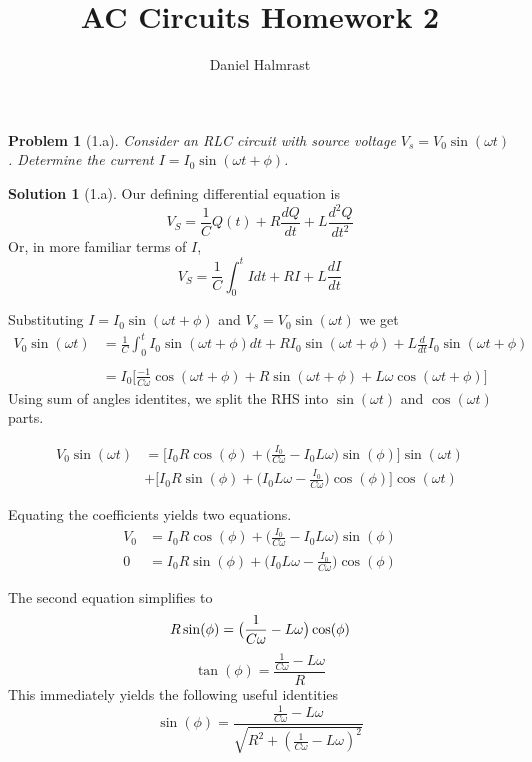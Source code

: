 \documentclass[12pt]{article}
\newtheorem*{problem}{Problem}
\theoremstyle{definition}
\newtheorem*{solution}{Solution}
\begin{document}
\title{AC Circuits Homework 2}
\author{Daniel Halmrast}
\maketitle

\begin{problem}[1.a]
Consider an RLC circuit with source voltage $V_s = V_0 \sin(\omega t)$.
Determine the current $I = I_0 \sin(\omega t + \phi)$.
\end{problem}

\begin{solution}[1.a]
Our defining differential equation is
\[
	V_S = \frac{1}{C}Q(t) + R\frac{dQ}{dt} + L\frac{d^2Q}{dt^2}
\]
Or, in more familiar terms of $I$,
\[
	V_S = \frac{1}{C}\int_0^t Idt + RI + L\frac{dI}{dt}
\]

Substituting $I = I_0 \sin(\omega t + \phi)$ and $V_s = V_0 \sin(\omega t)$ we get
\[
\begin{aligned}
	V_0 \sin(\omega t) 
	& = \frac{1}{C}\int_0^t I_0 \sin(\omega t + \phi)dt + R I_0 \sin(\omega t + \phi)+ L\frac{d}{dt}I_0 \sin(\omega t + \phi)\\
\\
	& = I_0 \Big[ \frac{-1}{C\omega}\cos(\omega t + \phi) + R \sin(\omega t + \phi) + L\omega \cos(\omega t + \phi)\Big]
\end{aligned}
\]
Using sum of angles identites, we split the RHS into $\sin(\omega t)$ and $\cos(\omega t)$ parts.

\[
\begin{aligned}
	V_0 \sin(\omega t) 
	& = \Big[ I_0R\cos(\phi) + \big(\frac{I_0}{C\omega}-I_0L\omega\big)\sin(\phi) \Big]\sin(\omega t)\\
	& + \Big[ I_0R\sin(\phi) + \big(I_0L\omega-\frac{I_0}{C\omega}\big)\cos(\phi) \Big]\cos(\omega t)
\end{aligned}
\]

Equating the coefficients yields two equations.
\[
\begin{aligned}
V_0 & = I_0R\cos(\phi) + \big(\frac{I_0}{C\omega}-I_0L\omega\big)\sin(\phi)\\
0   & = I_0R\sin(\phi) + \big(I_0L\omega-\frac{I_0}{C\omega}\big)\cos(\phi)
\end{aligned}
\]

The second equation simplifies to
\[
R\sin(\phi) = \big(\frac{1}{C\omega}-L\omega\big)\cos(\phi)\\
\]
\begin{equation}
\boxed{\tan(\phi) = \frac{\frac{1}{C\omega}-L\omega}{R}}
\end{equation}
This immediately yields the following useful identities
\begin{equation}
\sin(\phi) = \frac{\frac{1}{C\omega}-L\omega}{\sqrt{R^2 + (\frac{1}{C\omega}-L\omega)^2}}
\end{equation}


\end{solution}
\end{document}
